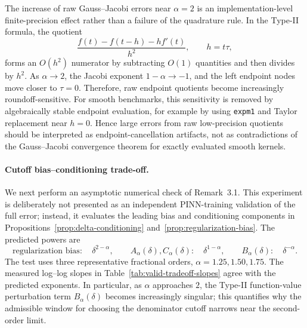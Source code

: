 \begin{remark}[Raw Gauss--Jacobi quotients near $\alpha=2$]
The increase of raw Gauss--Jacobi errors near $\alpha=2$ is an implementation-level finite-precision effect rather than a failure of the quadrature rule.  In the Type-II formula, the quotient
\[
    \frac{f(t)-f(t-h)-h f'(t)}{h^2},\qquad h=t\tau,
\]
forms an $O(h^2)$ numerator by subtracting $O(1)$ quantities and then divides by $h^2$.  As $\alpha\to2$, the Jacobi exponent $1-\alpha\to-1$, and the left endpoint nodes move closer to $\tau=0$.  Therefore, raw endpoint quotients become increasingly roundoff-sensitive.  For smooth benchmarks, this sensitivity is removed by algebraically stable endpoint evaluation, for example by using \texttt{expm1} and Taylor replacement near $h=0$.  Hence large errors from raw low-precision quotients should be interpreted as endpoint-cancellation artifacts, not as contradictions of the Gauss--Jacobi convergence theorem for exactly evaluated smooth kernels.
\end{remark}


\paragraph*{Cutoff bias--conditioning trade-off.}
We next perform an asymptotic numerical check of Remark~3.1.  This experiment is deliberately not presented as an independent PINN-training validation of the full error; instead, it evaluates the leading bias and conditioning components in Propositions~\ref{prop:delta-conditioning} and~\ref{prop:regularization-bias}.  The predicted powers are
\begin{equation}
    \text{regularization bias}:\quad \delta^{2-\alpha},
    \qquad
    A_\alpha(\delta),C_\alpha(\delta):\quad \delta^{1-\alpha},
    \qquad
    B_\alpha(\delta):\quad \delta^{-\alpha}.
\end{equation}
The test uses three representative fractional orders, $\alpha=1.25,1.50,1.75$.  The measured log--log slopes in Table~\ref{tab:valid-tradeoff-slopes} agree with the predicted exponents.  In particular, as $\alpha$ approaches $2$, the Type-II function-value perturbation term $B_\alpha(\delta)$ becomes increasingly singular; this quantifies why the admissible window for choosing the denominator cutoff narrows near the second-order limit.

